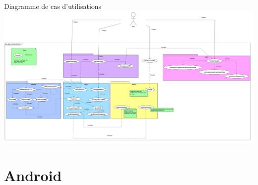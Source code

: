 \documentclass{beamer}
\begin{document}

\begin{frame}
	\begin{block}{Diagramme de cas d'utilisations}
		 \includegraphics[scale=0.13]{Images/UseCaseDiagram.jpg}
	\end{block}
\end{frame}




\section{Android}
\end{document}

